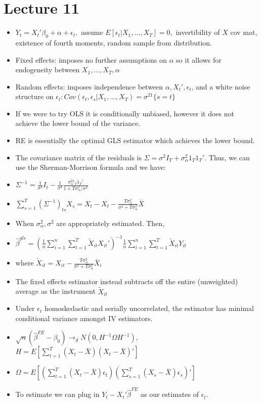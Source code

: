 \documentclass[11pt]{article} %
\begin{document}
\section{Lecture 11}
\begin{itemize}
\item $Y_t = X_t'\beta_0 + \alpha + \epsilon_t,$ assume $E[\epsilon_t|X_1,\dots,X_T] = 0,$ invertibility of $X$ cov mat, existence of fourth moments, random sample from distribution.
\item Fixed effects: imposes no further assumptions on $\alpha$ so it allows for endogeneity between $X_1,\dots, X_T,\alpha$
\item Random effects: imposes independence between $\alpha,X_t',\epsilon_t$, and a white noise structure on $\epsilon_t: Cov(\epsilon_t,\epsilon_s|X_1,\dots,X_T) = \sigma^21\{ s=t \}$
\item If we were to try OLS it is conditionally unbiased, however it does not achieve the lower bound of the variance.
\item RE is essentially the optimal GLS estimator which achieves the lower bound.
\item The covariance matrix of the residuals is $\Sigma = \sigma^2 I_T + \sigma^2_{\alpha}1_T1_T'.$ Thus, we can use the Sherman-Morrison formula and we have:
\item $\Sigma^{-1} = \frac{1}{\sigma^2}I_t - \frac{1}{\sigma^{4}}\frac{\sigma_{\alpha}^21_T1_T'}{1+T\sigma_{\alpha}^2/\sigma^2}$
\item $\sum_{s=1}^T(\Sigma^{-1})_{ts} X_{s} = X_t - X_t - \frac{T\sigma^2_{\alpha}}{\sigma^2 +T\sigma^2_{\alpha}} \bar{X}$
\item When $\sigma^2_{\alpha},\sigma^2$ are appropriately estimated. Then,
\item $\hat{\beta}^{gls} = \left( \frac{1}{n} \sum_{i=1}^n \sum_{t=1}^T \tilde{X}_{it}X_{it}'\right)^{-1} \frac{1}{n}\sum_{i=1}^n\sum_{t=1}^T \tilde{X}_{it}Y_{it}$
\item where $\tilde{X}_{it} = X_{it} - \frac{T\sigma^2_{\alpha}}{\sigma^2 + T\sigma^2_{\alpha}}\bar{X}_i$
\item The fixed effects estimator instead subtracts off the entire (unweighted) average as the instrument $\tilde{X}_{it}$
\item Under $\epsilon_t$ homoskedastic and serially uncorrelated, the estimator has minimal conditional variance amongst IV estimators.
\item $\sqrt{n}(\hat{\beta}^{FE} - \beta_0) \rightarrow_d N(0,H^{-1}\Omega H^{-1})$, $H =E\left[ \sum_{t=1}^T(X_t - \bar{X})(X_t - \bar{X})'\right]$
\item $\Omega = E\left[ \left( \sum_{t=1}^T (X_t - \bar{X})\epsilon_t \right) \left( \sum_{s=1}^T (X_s - \bar{X})\epsilon_s \right)' \right]$
\item To estimate we can plug in $Y_t - X_t'\hat{\beta}^{FE}$ as our estimates of $\epsilon_t$.
\end{itemize}
\end{document}
